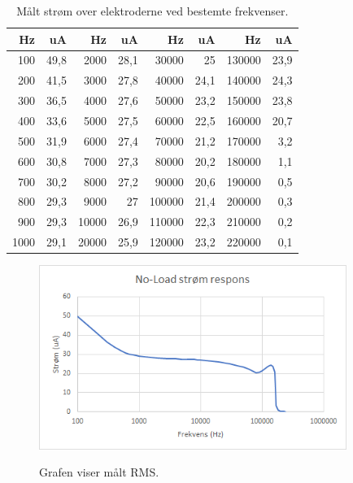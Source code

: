 \begin{table}[H]
\centering
\begin{tabular}{| r | r || r | r || r | r || r | r |}
    \hline
    \textbf{Hz} & \textbf{uA} & \textbf{Hz} & \textbf{uA} & \textbf{Hz} & \textbf{uA} & \textbf{Hz} & \textbf{uA}\\ \hline
    100 & 49,8 & 2000 & 28,1 & 30000 & 25 & 130000 & 23,9  \\ \hline
    200 & 41,5 & 3000 & 27,8 & 40000 & 24,1 & 140000 & 24,3  \\ \hline
    300 & 36,5 & 4000 & 27,6 & 50000 & 23,2 & 150000 & 23,8  \\ \hline
    400 & 33,6 & 5000 & 27,5 & 60000 & 22,5 & 160000 & 20,7  \\ \hline
    500 & 31,9 & 6000 & 27,4 & 70000 & 21,2 & 170000 & 3,2  \\ \hline
    600 & 30,8 & 7000 & 27,3 & 80000 & 20,2 & 180000 & 1,1  \\ \hline
    700 & 30,2 & 8000 & 27,2 & 90000 & 20,6 & 190000 & 0,5  \\ \hline
    800 & 29,3 & 9000 & 27 & 100000 & 21,4 &  200000 & 0,3  \\ \hline
    900 & 29,3 & 10000 & 26,9 & 110000 & 22,3 &  210000 & 0,2   \\ \hline
    1000 & 29,1 & 20000 & 25,9 & 120000 & 23,2 &  220000 & 0,1  \\ \hline
\end{tabular}
    \caption{Målt strøm over elektroderne ved bestemte frekvenser.}
    \label{table:frekvensernoload2}
\end{table} 



\begin{figure}[H]
\centering
{\includegraphics[width=10cm]
{Figure/testopstilling1fumlenoloadgraf}}
\caption{Grafen viser målt RMS.}
\label{fig:testopstilling1fumlenoloadgraf}
\end{figure}


